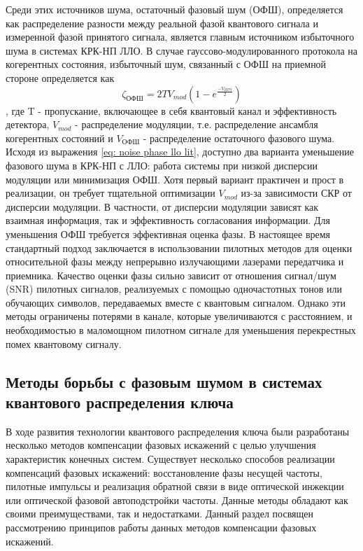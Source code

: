 Среди этих источников шума, остаточный фазовый шум (ОФШ), определяется как распределение разности между реальной фазой квантового сигнала и измеренной фазой принятого сигнала, является главным источником избыточного шума в системах КРК-НП ЛЛО. В случае гауссово-модулированного протокола на когерентных состояния, избыточный шум, связанный с ОФШ на приемной стороне определяется как 
\begin{equation}
    \zeta_{ОФШ} = 2TV_{mod}(1-e^\frac{-V_{RPN}}{2}) 
\end{equation}\label{eq: noise phase llo lit}, где T - пропускание, включающее в себя квантовый канал и эффективность детектора, $V_{mod}$ - распределение модуляции, т.е. распределение ансамбля когерентных состояний и $V_{ОФШ}$ - распределение остаточного фазового шума.
Исходя из выражения \ref{eq: noise phase llo lit}, доступно два варианта уменьшение фазового шума в КРК-НП с ЛЛО: работа системы при низкой дисперсии модуляции или минимизация ОФШ. Хотя первый вариант практичен и прост в реализации, он требует тщательной оптимизации $V_{mod}$ из-за зависимости СКР от дисперсии модуляции. В частности, от дисперсии модуляции зависят как взаимная информация, так и эффективность согласования информации.
Для уменьшения ОФШ требуется эффективная оценка фазы. В настоящее время стандартный подход заключается в использовании пилотных методов для оценки относительной фазы между непрерывно излучающими лазерами  передатчика и приемника. Качество оценки фазы сильно зависит от отношения сигнал/шум (SNR) пилотных сигналов, реализуемых с помощью одночастотных тонов или обучающих символов, передаваемых вместе с квантовым сигналом. Однако эти методы ограничены потерями в канале, которые увеличиваются с расстоянием, и необходимостью в маломощном пилотном сигнале для уменьшения перекрестных помех квантовому сигналу.

\subsection{Методы борьбы с фазовым шумом в системах квантового распределения ключа}\label{sec:ch1/sect5/subsec1}
В ходе развития технологии квантового распределения ключа были разработаны несколько методов компенсации фазовых искажений с целью улучшения характеристик конечных систем. Существует несколько способов реализации компенсаций фазовых искажений: восстановление фазы несущей частоты, пилотные импульсы и реализация обратной связи в виде оптической инжекции или оптической фазовой автоподстройки частоты. Данные методы обладают как своими преимуществами, так и недостатками. Данный раздел посвящен рассмотрению принципов работы данных методов компенсации фазовых искажений. 
